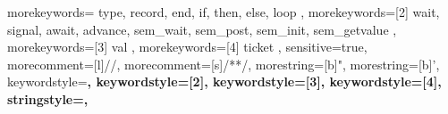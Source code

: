 {
	morekeywords={
		type,
		record,
		end,
		if,
		then,
		else,
		loop
	},
	morekeywords=[2]{
		wait,
		signal,
		await,
		advance,
		sem_wait,
		sem_post,
		sem_init,
		sem_getvalue
	},
	morekeywords=[3]{
		val
	},
	morekeywords=[4]{
		ticket
	},
	sensitive=true,
	morecomment=[l]{//},
	morecomment=[s]{/*}{*/},
	morestring=[b]",
	morestring=[b]',
	keywordstyle=\bfseries\ttfamily\color{blue},
	keywordstyle=[2]\bfseries\ttfamily\color{teal},
	keywordstyle=[3]\bfseries\ttfamily\color{olive},
	keywordstyle=[4]\bfseries\ttfamily\color{olive},
	stringstyle=\color{green}\ttfamily,
}
